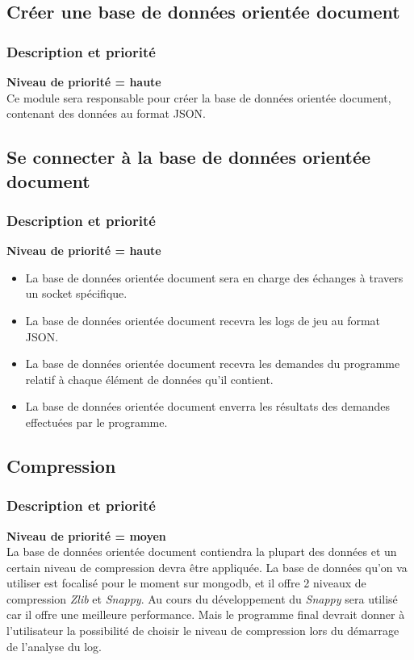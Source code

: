 \documentclass{scrreprt}
\begin{document}
\subsection{Créer une base de données orientée document }

\subsubsection{Description et priorité}
\textbf{Niveau de priorité = haute}\\
Ce module sera responsable pour créer la base de données orientée document, contenant des données au format JSON.
\subsection{Se connecter à la base de données orientée document }
\subsubsection{Description et priorité}
\textbf{Niveau de priorité = haute}\\
\begin{itemize}
\item La base de données orientée document sera en charge des échanges à travers un socket spécifique.
\item La base de données orientée document recevra les logs de jeu au format JSON.
\item La base de données orientée document recevra les demandes du programme relatif à chaque élément de données qu'il contient.
\item La base de données orientée document enverra les résultats des demandes effectuées par le programme.
\end{itemize}


\subsection{Compression}
\subsubsection{Description et priorité}
\textbf{Niveau de priorité = moyen}\\

La base de données orientée document contiendra la plupart des données et un certain niveau de compression devra être appliquée.
La base de données qu’on va utiliser est focalisé pour le moment sur mongodb, et il offre 2 niveaux de compression \textit{Zlib} et \textit{Snappy}.
Au cours du développement du \textit{Snappy} sera utilisé car il offre une meilleure performance.
Mais le programme final devrait donner à l'utilisateur la possibilité de choisir le niveau de compression lors du démarrage de l'analyse du log.
\end{document}
